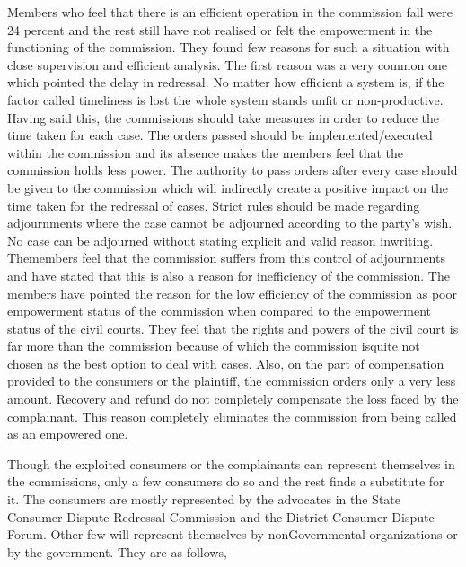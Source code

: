 \begin{multicols}{2}
\noi
Members who feel that there is an efficient operation in the commission fall were 24 percent
and the rest still have not realised or felt the empowerment in the functioning of the
commission. They found few reasons for such a situation with close supervision and efficient
analysis. The first reason was a very common one which pointed the delay in redressal. No
matter how efficient a system is, if the factor called timeliness is lost the whole system stands
unfit or non-productive. Having said this, the commissions should take measures in order to
reduce the time taken for each case. The orders passed should be implemented/executed within
the commission and its absence makes the members feel that the commission holds less power.
The authority to pass orders after every case should be given to the commission which will
indirectly create a positive impact on the time taken for the redressal of cases. Strict rules should
be made regarding adjournments where the case cannot be adjourned according to the party’s
wish. No case can be adjourned without stating explicit and valid reason inwriting. Themembers
feel that the commission suffers from this control of adjournments and have stated that this is
also a reason for inefficiency of the commission. The members have pointed the reason for the
low efficiency of the commission as poor empowerment status of the commission when
compared to the empowerment status of the civil courts. They feel that the rights and powers
of the civil court is far more than the commission because of which the commission isquite not
chosen as the best option to deal with cases. Also, on the part of compensation provided to the
consumers or the plaintiff, the commission orders only a very less amount. Recovery and refund
do not completely compensate the loss faced by the complainant. This reason completely
eliminates the commission from being called as an empowered one.



\noi
Though the exploited consumers or the complainants can represent themselves in the
commissions, only a few consumers do so and the rest finds a substitute for it. The consumers
are mostly represented by the advocates in the State Consumer Dispute Redressal Commission
and the District Consumer Dispute Forum. Other few will represent themselves by nonGovernmental organizations or by the government. They are as follows,


\end{multicols}
